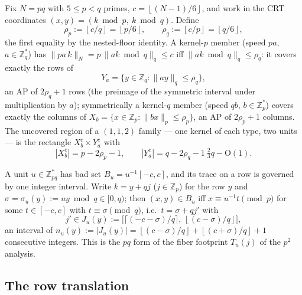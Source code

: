 \documentclass[11pt,a4paper]{article}
\numberwithin{equation}{section}
\theoremstyle{plain}
\theoremstyle{definition}
\theoremstyle{remark}
\newcommand{\Z}{\mathbb{Z}}
\newcommand{\floor}[1]{\left\lfloor #1 \right\rfloor}
\begin{document}
Fix $N=pq$ with $5\le p<q$ primes, $c=\floor{(N-1)/6}$, and work in the CRT
coordinates $(x,y)=(k\bmod p,\ k\bmod q)$. Define
\[
\rho_p:=\floor{c/q}=\floor{p/6},\qquad \rho_q:=\floor{c/p}=\floor{q/6},
\]
the first equality by the nested-floor identity. A kernel-$p$ member (speed
$pa$, $a\in\Z_q^{*}$) has $\|pa\,k\|_{N}=p\,\|ak\bmod q\|_q\le c$ iff
$\|ak\bmod q\|_q\le\rho_q$: it covers exactly the rows of
\[
Y_a=\{y\in\Z_q:\|ay\|_q\le\rho_q\},
\]
an AP of $2\rho_q+1$ rows (the preimage of the symmetric interval under
multiplication by $a$); symmetrically a kernel-$q$ member (speed $qb$,
$b\in\Z_p^{*}$) covers exactly the columns of
$X_b=\{x\in\Z_p:\|bx\|_p\le\rho_p\}$, an AP of $2\rho_p+1$ columns. The
uncovered region of a $(1,1,2)$ family --- one kernel of each type, two units
--- is the rectangle $X_b^{c}\times Y_a^{c}$ with
\[
|X_b^{c}|=p-2\rho_p-1,\qquad |Y_a^{c}|=q-2\rho_q-1\ \tfrac{2}{3}q-\mathrm{O}(1).
\]

A unit $u\in\Z_{pq}^{*}$ has bad set $B_u=u^{-1}[-c,c]$, and its trace on a
row is governed by one integer interval. Write $k=y+qj$ ($j\in\Z_p$) for the
row $y$ and $\sigma=\sigma_u(y):=uy\bmod q\in[0,q)$; then
$(x,y)\in B_u$ iff $x\equiv u^{-1}t\pmod p$ for some $t\in[-c,c]$ with
$t\equiv\sigma\pmod q$, i.e.\ $t=\sigma+qj'$ with
\begin{equation}\label{eq:Jinterval}
j'\in J_u(y):=\bigl[\lceil(-c-\sigma)/q\rceil,\ \floor{(c-\sigma)/q}\bigr],
\end{equation}
an interval of $n_u(y):=|J_u(y)|=\floor{(c-\sigma)/q}+\floor{(c+\sigma)/q}+1$
consecutive integers. This is the $pq$ form of the fiber footprint
$T_u(j)$ of the $p^2$ analysis.

\subsection{The row translation}\label{sec:pq-thm}
\end{document}
